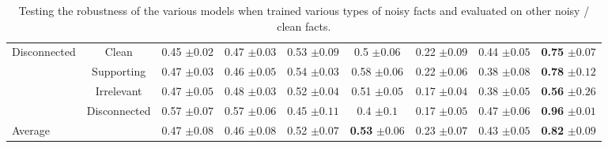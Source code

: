 \begin{table*}[t!]
{\begin{tabular}{@{}cccccccc|c@{}}
\multirow{3}{*}{Disconnected} & \multicolumn{1}{c|}{Clean} & 0.45 \tiny $\pm 0.02$ & 0.47 \tiny $\pm 0.03$ & 0.53 \tiny $\pm 0.09$ & 0.5 \tiny $\pm 0.06$ & 0.22 \tiny $\pm 0.09$ & 0.44 \tiny $\pm 0.05$ & \textbf{0.75} \tiny $\pm 0.07$ \\
 & \multicolumn{1}{c|}{Supporting} & 0.47 \tiny $\pm 0.03$ & 0.46 \tiny $\pm 0.05$ & 0.54 \tiny $\pm 0.03$ & 0.58 \tiny $\pm 0.06$ & 0.22 \tiny $\pm 0.06$ & 0.38 \tiny $\pm 0.08$ & \textbf{0.78} \tiny $\pm 0.12$ \\
 & \multicolumn{1}{c|}{Irrelevant} & 0.47 \tiny $\pm 0.05$ & 0.48 \tiny $\pm 0.03$ & 0.52 \tiny $\pm 0.04$ & 0.51 \tiny $\pm 0.05$ & 0.17 \tiny $\pm 0.04$ & 0.38 \tiny $\pm 0.05$ & \textbf{0.56} \tiny $\pm 0.26$ \\
\multicolumn{1}{l}{} & \multicolumn{1}{c|}{Disconnected} & 0.57 \tiny $\pm 0.07$ & 0.57 \tiny $\pm 0.06$ & 0.45 \tiny $\pm 0.11$ & 0.4 \tiny $\pm 0.1$ & 0.17 \tiny $\pm 0.05$ & 0.47 \tiny $\pm 0.06$ & \textbf{0.96} \tiny $\pm 0.01$ \\ \midrule
\multicolumn{1}{l}{Average} & \multicolumn{1}{c|}{} & 0.47 \tiny $\pm 0.08$ & 0.46 \tiny $\pm 0.08$ & 0.52 \tiny $\pm 0.07$ & \textbf{0.53} \tiny $\pm 0.06$ & 0.23 \tiny $\pm 0.07$ & 0.43 \tiny $\pm 0.05$ & \textbf{0.82} \tiny $\pm 0.09$ \\ \bottomrule
\end{tabular}}
\caption{Testing the robustness of the various models when trained various types of noisy facts and evaluated on other noisy / clean facts.}
\label{tab:robust_appen}
\end{table*}
